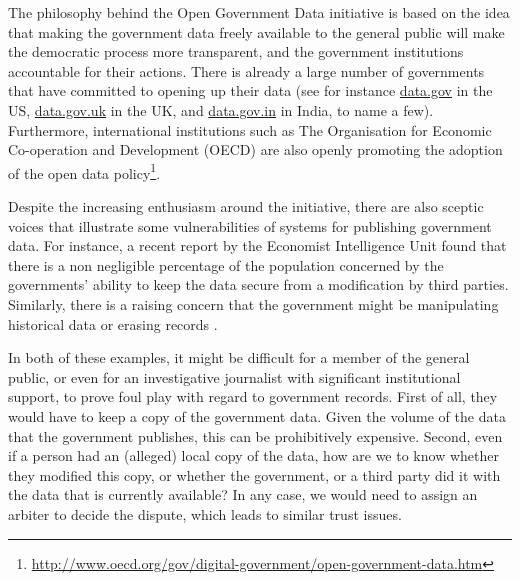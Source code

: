 The philosophy behind the Open Government Data initiative is based on the idea that making the government data freely available to the general public will make the democratic process more transparent, and the government institutions accountable for their actions. There is already a large number of governments that have committed to opening up their data (see for instance \url{data.gov} in the US, \url{data.gov.uk} in the UK, and \url{data.gov.in} in India, to name a few). Furthermore, international institutions such as The Organisation for Economic Co-operation and Development (OECD) are also openly promoting the adoption of the open data policy\footnote{\url{http://www.oecd.org/gov/digital-government/open-government-data.htm}}.

Despite the increasing enthusiasm around the initiative, there are also sceptic voices that illustrate some vulnerabilities of systems for publishing government data. For instance, a recent report by the Economist Intelligence Unit \cite{economist} found that there is a non negligible percentage of the population concerned by the governments' ability to keep the data secure from a modification by third parties. Similarly, there is a raising concern that the government might be manipulating historical data or erasing records \cite{poynter}.

In both of these examples, it might be difficult for a member of the general public, or even for an investigative journalist with significant institutional support, to prove foul play with regard to government records. First of all, they would have to keep a copy of the government data. Given the volume of the data that the government publishes, this can be prohibitively expensive. Second, even if a person had an (alleged) local copy of the data, how are we to know whether they modified this copy, or whether the government, or a third party did it with the data that is currently available? In any case, we would need to assign an arbiter to decide the dispute, which leads to similar trust issues.





